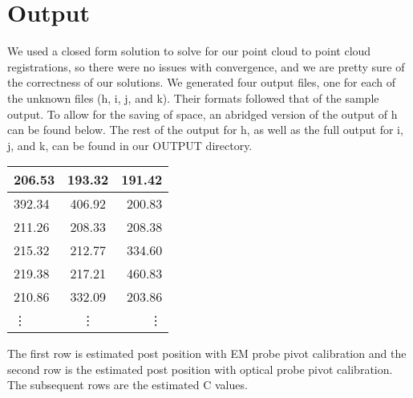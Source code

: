 \documentclass[a4paper]{article}
\begin{document}
\section{Output}
We used a closed form solution to solve for our point cloud to point cloud registrations, so there were no issues with convergence, and we are pretty sure of the correctness of our solutions.
\break
We generated four output files, one for each of the unknown files (h, i, j, and k). Their formats followed that of the sample output. To allow for the saving of space, an abridged version of the output of h can be found below. The rest of the output for h, as well as the full output for i, j, and k, can be found in our OUTPUT directory.
\begin{center}
\begin{tabular}{| l | c | r |}
\hline
206.53 & 193.32 & 191.42 \\
\hline
392.34 & 406.92 & 200.83 \\
\hline
211.26 & 208.33 & 208.38 \\
215.32 & 212.77 & 334.60 \\
219.38 & 217.21 & 460.83 \\
210.86 & 332.09 & 203.86 \\
\vdots & \vdots & \vdots \\
\hline
\end{tabular}
\end{center}
\break
The first row is estimated post position with EM probe pivot calibration and the second row is the estimated post position with
optical probe pivot calibration. The subsequent rows are the estimated C values.
\end{document}
